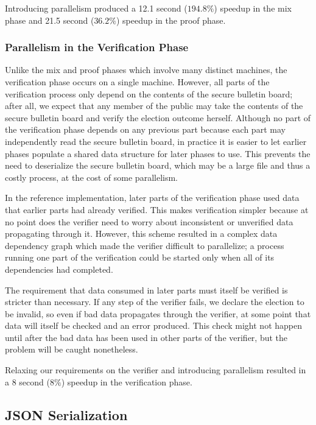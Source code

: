 Introducing parallelism produced a 12.1 second ($194.8\%$) speedup in the mix phase and 21.5 second ($36.2\%$) speedup in the proof phase.

\subsubsection{Parallelism in the Verification Phase}

Unlike the mix and proof phases which involve many distinct machines, the verification phase occurs on a single machine. However, all parts of the verification process only depend on the contents of the secure bulletin board; after all, we expect that any member of the public may take the contents of the secure bulletin board and verify the election outcome herself. Although no part of the verification phase depends on any previous part because each part may independently read the secure bulletin board, in practice it is easier to let earlier phases populate a shared data structure for later phases to use. This prevents the need to deserialize the secure bulletin board, which may be a large file and thus a costly process, at the cost of some parallelism.

In the reference implementation, later parts of the verification phase used data that earlier parts had already verified. This makes verification simpler because at no point does the verifier need to worry about inconsistent or unverified data propagating through it. However, this scheme resulted in a complex data dependency graph which made the verifier difficult to parallelize; a process running one part of the verification could be started only when all of its dependencies had completed.

The requirement that data consumed in later parts must itself be verified is stricter than necessary. If any step of the verifier fails, we declare the election to be invalid, so even if bad data propagates through the verifier, at some point that data will itself be checked and an error produced. This check might not happen until after the bad data has been used in other parts of the verifier, but the problem will be caught nonetheless.

Relaxing our requirements on the verifier and introducing parallelism resulted in a 8 second ($8\%$) speedup in the verification phase.

\subsection{JSON Serialization} \label{perf:optimizations:json}

